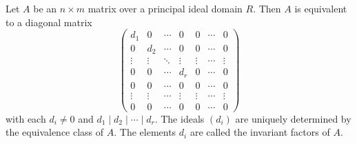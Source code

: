 Let $A$ be an $n \times m$ matrix over a principal ideal domain $R$. Then $A$ is equivalent to a diagonal matrix
\[
\begin{pmatrix}
d_1 & 0 & \cdots & 0 & 0 & \cdots & 0 \\
0 & d_2 & \cdots & 0 & 0 & \cdots & 0 \\
\vdots & \vdots & \ddots & \vdots & \vdots & \cdots & \vdots \\
0 & 0 & \cdots & d_r & 0 & \cdots & 0 \\
0 & 0 & \cdots & 0 & 0 & \cdots & 0 \\
\vdots & \vdots & \cdots & \vdots & \vdots & \cdots & \vdots \\
0 & 0 & \cdots & 0 & 0 & \cdots & 0
\end{pmatrix}
\]
with each $d_i \neq 0$ and $d_1 \mid d_2 \mid \cdots \mid d_r$. The ideals $(d_i)$ are uniquely determined by the equivalence class of $A$. The elements $d_i$ are called the invariant factors of $A$.
